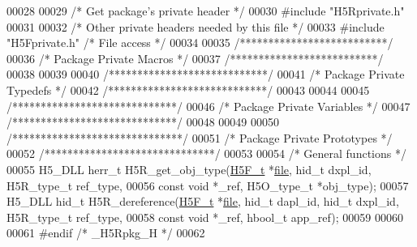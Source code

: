 \begin{DoxyCode}
00028 
00029 \textcolor{comment}{/* Get package's private header */}
00030 \textcolor{preprocessor}{#include "H5Rprivate.h"}
00031 
00032 \textcolor{comment}{/* Other private headers needed by this file */}
00033 \textcolor{preprocessor}{#include "H5Fprivate.h"}         \textcolor{comment}{/* File access              */}
00034 
00035 \textcolor{comment}{/**************************/}
00036 \textcolor{comment}{/* Package Private Macros */}
00037 \textcolor{comment}{/**************************/}
00038 
00039 
00040 \textcolor{comment}{/****************************/}
00041 \textcolor{comment}{/* Package Private Typedefs */}
00042 \textcolor{comment}{/****************************/}
00043 
00044 
00045 \textcolor{comment}{/*****************************/}
00046 \textcolor{comment}{/* Package Private Variables */}
00047 \textcolor{comment}{/*****************************/}
00048 
00049 
00050 \textcolor{comment}{/******************************/}
00051 \textcolor{comment}{/* Package Private Prototypes */}
00052 \textcolor{comment}{/******************************/}
00053 
00054 \textcolor{comment}{/* General functions */}
00055 H5\_DLL herr\_t H5R\_get\_obj\_type(\hyperlink{struct_h5_f__t}{H5F\_t} *\hyperlink{structfile}{file}, hid\_t dxpl\_id, H5R\_type\_t ref\_type,
00056     \textcolor{keyword}{const} \textcolor{keywordtype}{void} *\_ref, H5O\_type\_t *obj\_type);
00057 H5\_DLL hid\_t H5R\_dereference(\hyperlink{struct_h5_f__t}{H5F\_t} *\hyperlink{structfile}{file}, hid\_t dapl\_id, hid\_t dxpl\_id, H5R\_type\_t ref\_type,
00058     \textcolor{keyword}{const} \textcolor{keywordtype}{void} *\_ref, hbool\_t app\_ref);
00059 
00060 
00061 \textcolor{preprocessor}{#endif }\textcolor{comment}{/* \_H5Rpkg\_H */}\textcolor{preprocessor}{}
00062 
\end{DoxyCode}
